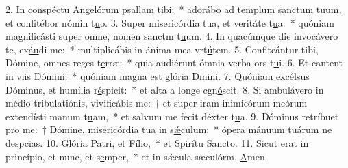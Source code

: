 2. In conspéctu Angelórum psallam t\uline{i}bi:~* adorábo ad templum sanctum tuum, et confitébor nómin t\uline{u}o.
3. Super misericórdia tua, et veritáte t\uline{u}a:~* quóniam magnificásti super omne, nomen sanctm t\uline{u}um.
4. In quacúmque die invocávero te, ex\uline{áu}di me:~* multiplicábis in ánima mea vrt\uline{ú}tem.
5. Confiteántur tibi, Dómine, omnes reges t\uline{e}rræ:~* quia audiérunt ómnia verba ors t\uline{u}i.
6. Et cantent in viis D\uline{ó}mini:~* quóniam magna est glória Dm\uline{i}ni.
7. Quóniam excélsus Dóminus, et humília r\uline{é}spicit:~* et alta a longe cgn\uline{ó}scit.
8. Si ambulávero in médio tribulatiónis, vivificábis me:~† et super iram inimicórum meórum extendísti manum t\uline{u}am,~* et salvum me fecit déxter t\uline{u}a.
9. Dóminus retríbuet pro me:~† Dómine, misericórdia tua in s\uline{ǽ}culum:~* ópera mánuum tuárum ne despc\uline{i}as.
10. Glória Patri, et F\uline{í}lio,~* et Spirítu S\uline{a}ncto.
11. Sicut erat in princípio, et nunc, et s\uline{e}mper,~* et in sǽcula sæculórm. \uline{A}men.
